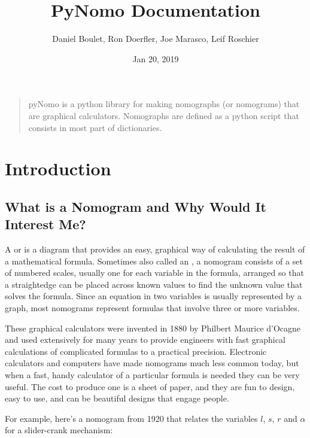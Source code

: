 \documentclass[a4paper,11pt,english]{sphinxmanual}
\title{PyNomo Documentation}
\date{Jan 20, 2019}
\author{Daniel Boulet, Ron Doerfler, Joe Marasco, Leif Roschier}
\begin{document}
\pagestyle{empty}
\sphinxmaketitle
\pagestyle{plain}
\sphinxtableofcontents
\pagestyle{normal}
\label{\detokenize{index::doc}}

\begin{quote}

pyNomo is a python library for making nomographs (or nomograms) that are graphical calculators.
Nomographs are defined as a python script that consists
in most part of dictionaries.
\end{quote}


\chapter{Introduction}
\label{\detokenize{introduction/introduction:introduction}}\label{\detokenize{introduction/introduction::doc}}

\section{What is a Nomogram and Why Would It Interest Me?}
\label{\detokenize{introduction/introduction:what-is-a-nomogram-and-why-would-it-interest-me}}
A  or  is a diagram that provides an easy, graphical way of calculating the result of a mathematical formula. Sometimes also called an , a nomogram consists of a set of numbered scales, usually one for each variable in the formula, arranged so that a straightedge can be placed across known values to find the unknown value that solves the formula. Since an equation in two variables is usually represented by a graph, most nomograms represent formulas that involve three or more variables.

These graphical calculators were invented in 1880 by Philbert Maurice d’Ocagne and used extensively for many years to provide engineers with fast graphical calculations of complicated formulas to a practical precision. Electronic calculators and computers have made nomograms much less common today, but when a fast, handy calculator of a particular formula is needed they can be very useful. The cost to produce one is a sheet of paper, and they are fun to design, easy to use, and can be beautiful designs that engage people.

For example, here’s a nomogram from 1920 that relates the variables \(l\), \(s\), \(r\) and \(\alpha\) for a slider-crank mechanism:

\end{document}
